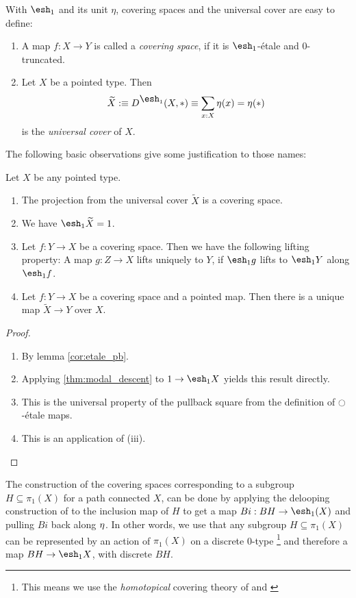 \documentclass[9pt,twosided]{amsart}
\newcommand{\shape}{\ensuremath{\mathord{\raisebox{0.5pt}{\text{\rm\esh}}}}}
\begin{document}
With $\shape_1$ and its unit $\eta$, covering spaces and the universal cover are easy to define:
\begin{defn}
  \begin{enumerate}
  \item A map $f:X\to Y$ is called a \emph{covering space}, if it is $\shape_1$-étale and $0$-truncated.
  \item Let $X$ be a pointed type. Then
    \[ \widetilde{X}:\equiv D^{\shape_1}(X,\ast)\equiv\sum_{x:X}\modalunit(x)=\modalunit(\ast) \]
    is the \emph{universal cover} of $X$.
  \end{enumerate}

\end{defn}
The following basic observations give some justification to those names:
\begin{rmk}
  Let $X$ be any pointed type.
  \begin{enumerate}
  \item The projection from the universal cover $\widetilde{X}$ is a covering space.
  \item We have $\shape_1 \widetilde{X} = 1$.
  \item Let $f:Y\to X$ be a covering space. Then we have the following lifting property:
    A map $g:Z\to X$ lifts uniquely to $Y$, if $\shape_1 g$ lifts to $\shape_1 Y$ along $\shape_1 f$.
  \item Let $f:Y\to X$ be a covering space and a pointed map. Then there is a unique map $\widetilde{X}\to Y$ over $X$.
  \end{enumerate}
\end{rmk}
\begin{proof}
  \begin{enumerate}
  \item By lemma \ref{cor:etale_pb}. 
  \item Applying \ref{thm:modal_descent} to $1\to \shape_1 X$ yields this result directly.
  \item This is the universal property of the pullback square from the definition of ${\ocircle}$-étale maps.
  \item This is an application of (iii).
  \end{enumerate}
\end{proof}

The construction of the covering spaces corresponding to a subgroup $H\subseteq \pi_1(X)$ for a path connected $X$,
can be done by applying the delooping construction of \cite{LicataFinster} to the inclusion map of $H$ to get a map $Bi:BH\to\shape_1(X)$ and pulling $Bi$ back along ${\eta_{}}$. In other words, we use that any subgroup $H\subseteq\pi_1(X)$ can be represented by an action of $\pi_1(X)$ on a discrete 0-type
\footnote{This means we use the \emph{homotopical} covering theory of \cite[Section 3.1]{favonia-thesis} 
and \cite[Section 7.1]{ulrik-egbert-floris-groups}}
and therefore a map $BH\to \shape_1X$, with discrete $BH$.
\end{document}
